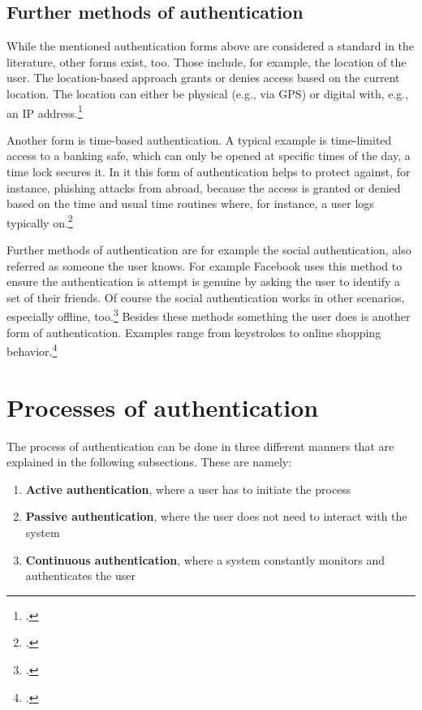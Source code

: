 \subsection{Further methods of authentication}

While the mentioned authentication forms above are considered a standard in the literature, other forms exist, too. Those include, for example, the location of the user. The location-based approach grants or denies access based on the current location. The location can either be physical (e.g., via GPS) or digital with, e.g., an IP address.\footcites{6296127}[See][Chapter 13.9]{2308830}

Another form is time-based authentication. A typical example is time-limited access to a banking safe, which can only be opened at specific times of the day, a time lock secures it. In \gls{it} this form of authentication helps to protect against, for instance, phishing attacks from abroad, because the access is granted or denied based on the time and usual time routines where, for instance, a user logs typically on.\footcite[See][191]{dasgupta2017multi}

Further methods of authentication are for example the social authentication, also referred as \frqq someone the user knows\flqq. For example Facebook uses this method to ensure the authentication is attempt is genuine by asking the user to identify a set of their friends. Of course the social authentication works in other scenarios, especially offline, too.\footcites[See][]{Brainard2006}[See][278--279]{shostack2014threat} Besides these methods \frqq something the user does\flqq{} is another form of authentication. Examples range from keystrokes to online shopping behavior.\footcites[See][]{10.1007/978-3-642-18178-8_9}[See][]{7460349}

\section{Processes of authentication}

The process of authentication can be done in three different manners that are explained in the following subsections. These are namely:

\begin{enumerate}
	\item \textbf{Active authentication}, where a user has to initiate the process
	\item \textbf{Passive authentication}, where the user does not need to interact with the system
	\item \textbf{Continuous authentication}, where a system constantly monitors and authenticates the user
\end{enumerate}

